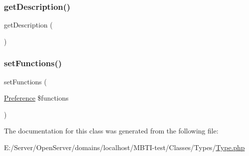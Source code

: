\subsubsection{\texorpdfstring{get\+Description()}{getDescription()}}
{\footnotesize\ttfamily get\+Description (\begin{DoxyParamCaption}{ }\end{DoxyParamCaption})}

\mbox{\label{class_classes_1_1_types_1_1_type_a71d04ef07804d67e24e87339e00d8446}} 
\subsubsection{\texorpdfstring{set\+Functions()}{setFunctions()}}
{\footnotesize\ttfamily set\+Functions (\begin{DoxyParamCaption}\item[{\hyperlink{class_classes_1_1_preferences_1_1_preference}{Preference}}]{\$functions }\end{DoxyParamCaption})}



The documentation for this class was generated from the following file\+:\begin{DoxyCompactItemize}
\item 
E\+:/\+Server/\+Open\+Server/domains/localhost/\+M\+B\+T\+I-\/test/\+Classes/\+Types/\hyperlink{_type_8php}{Type.\+php}\end{DoxyCompactItemize}
